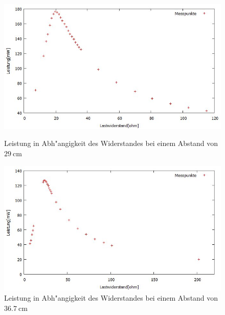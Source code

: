 	\begin{figure}[htbp]
		\centering
		\includegraphics[width = 12cm]{img/290p.jpg}
		\caption{Leistung in Abh"angigkeit des Widerstandes bei einem Abstand von $\SI{29}{\centi\meter}$}
		\label{PR1}

		\centering
		\includegraphics[width = 12cm]{img/367p.jpg}
		\caption{Leistung in Abh"angigkeit des Widerstandes bei einem Abstand von $\SI{36.7}{\centi\meter}$}
		\label{PR2}
\end{figure}
